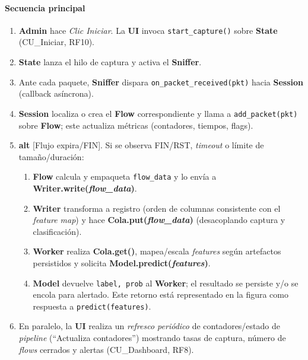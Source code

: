 \paragraph{Secuencia principal}
\begin{enumerate}
  \item \textbf{Admin} hace \emph{Clic Iniciar}. La \textbf{UI} invoca \texttt{start\_capture()} sobre \textbf{State} (CU\_Iniciar, RF10).
  \item \textbf{State} lanza el hilo de captura y activa el \textbf{Sniffer}.
  \item Ante cada paquete, \textbf{Sniffer} dispara \texttt{on\_packet\_received(pkt)} hacia \textbf{Session} (callback asíncrona).
  \item \textbf{Session} localiza o crea el \textbf{Flow} correspondiente y llama a \texttt{add\_packet(pkt)} sobre \textbf{Flow}; este actualiza métricas (contadores, tiempos, flags).
  \item \textbf{alt} [Flujo expira/FIN]. Si se observa FIN/RST, \emph{timeout} o límite de tamaño/duración:
    \begin{enumerate}
      \item \textbf{Flow} calcula y empaqueta \texttt{flow\_data} y lo envía a \textbf{Writer.write(\textit{flow\_data})}.
      \item \textbf{Writer} transforma a registro (orden de columnas consistente con el \emph{feature map}) y hace \textbf{Cola.put(\textit{flow\_data})} (desacoplando captura y clasificación).
      \item \textbf{Worker} realiza \textbf{Cola.get()}, mapea/escala \emph{features} según artefactos persistidos y solicita \textbf{Model.predict(\textit{features})}.
      \item \textbf{Model} devuelve \texttt{label, prob} al \textbf{Worker}; el resultado se persiste y/o se encola para alertado. Este retorno está representado en la figura como respuesta a \texttt{predict(features)}.
    \end{enumerate}
  \item En paralelo, la \textbf{UI} realiza un \emph{refresco periódico} de contadores/estado de \emph{pipeline} (``Actualiza contadores'') mostrando tasas de captura, número de \emph{flows} cerrados y alertas (CU\_Dashboard, RF8).
\end{enumerate}

